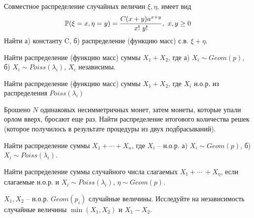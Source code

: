 \begin{problem}
    Совместное распределение случайных величин $\xi, \eta$, имеет вид 
    \[
        \operatorname{\mathbb{P}}(\xi = x, \eta = y) = \frac{C (x + y) a^{x+y}}{x! \ y!}, \ x, y \geq 0
    \]
    Найти а) константу C, б) распределение (функцию масс) с.в. $\xi + \eta$.
\end{problem}

\begin{problem}
    Найти распределение (функцию масс) суммы $X_1 + X_2$, где а) $X_i \sim Geom(p)$, б) $X_i \sim Poiss(\lambda_i)$, $X_i$ независимы.\\    
\end{problem}

\begin{problem}
    Найти распределение (функцию масс) суммы $X_1 + X_2$, где $X_i$ н.о.р. из распределения $Poiss(\lambda_i)$
\end{problem}

\begin{problem}
    Брошено $N$ одинаковых несимметричных монет, затем монеты, которые упали орлом вверх, бросают
еще раз.
    Найти распределение итогового количества решек (которое получилось в результате процедуры из двух подбрасываний).
\end{problem}

\begin{problem}
    Найти распределение суммы $X_1 + \cdots + X_n$, где $X_i$ -- н.о.р. а) $X_i \sim Geom(p)$, б) $X_i \sim Poiss(\lambda_i)$.
\end{problem}

\begin{problem}
    Найти распределение суммы случайного числа слагаемых $X_1 + \cdots \ + X_{\eta}$, если слагаемые н.о.р. и $X_i \sim Poiss(\lambda_i)$, $\eta \sim Geom(p)$.
\end{problem}

\begin{problem}
    $X_1, X_2$ -- н.о.р. $Geom(p_i)$ случайные величины.
    Исследуйте на независимость случайные величины $\min(X_1, X_2)$ и $X_1 - X_2$.
\end{problem}
